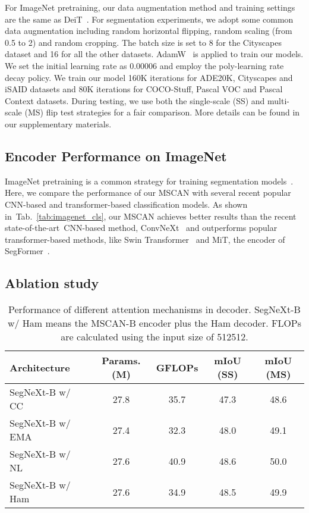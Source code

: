 \documentclass{article}
\def\sArt{state-of-the-art~}
\newcommand{\tabref}[1]{Tab.~\ref{#1}}
\begin{document}
For ImageNet pretraining, our data augmentation method and training settings are the same as DeiT~\cite{touvron2021training}.
For segmentation experiments, we adopt some common data augmentation including random horizontal flipping, random scaling (from 0.5 to 2) and random cropping.
The batch size is set to
8 for the Cityscapes dataset and 16 for all the other datasets.
AdamW~\cite{loshchilov2017decoupled} is applied to train our models.
We set the initial learning rate as 0.00006 and employ the poly-learning rate decay policy.
We train our model 160K iterations for ADE20K, Cityscapes and iSAID datasets and 
80K iterations for COCO-Stuff, Pascal VOC and Pascal Context datasets.
During testing, we use both the 
single-scale (SS) and multi-scale (MS) flip test strategies  for a fair comparison.
More details can be found in our supplementary materials.





\subsection{Encoder Performance on ImageNet}
\label{sec:imagenet}

ImageNet pretraining is a common strategy for training segmentation models~\cite{zhao2017pyramid,chen2017rethinking,xie2021segformer,yuan2021hrformer,chen2017deeplab}.
Here, we compare the performance of our MSCAN with several recent popular CNN-based
and transformer-based classification models.
As shown in~\tabref{tab:imagenet_cls}, our MSCAN achieves better results than the recent \sArt CNN-based method, ConvNeXt~\cite{liu2022convnet} and outperforms popular transformer-based methods, like Swin Transformer~\cite{liu2021swin} and MiT, the encoder of SegFormer~\cite{xie2021segformer}.




\subsection{Ablation study}


\begin{table}[t]
    \centering
    \renewcommand{\arraystretch}{1}
    \renewcommand{\tabcolsep}{3mm}
    \caption{Performance of different attention mechanisms in decoder. 
    SegNeXt-B w/ Ham means the MSCAN-B encoder plus the Ham decoder.
    FLOPs are calculated using the input size of 512512.
    }
    \begin{tabular}{l|cc|cc}
        \toprule
    	Architecture & Params. (M) & GFLOPs & mIoU (SS) & mIoU (MS)  \\ \midrule
    	SegNeXt-B w/ CC~\cite{huang2019ccnet} & 27.8 & 35.7 & 47.3 & 48.6 \\ 
    	SegNeXt-B w/ EMA~\cite{li2019expectation} & 27.4 & 32.3 & 48.0 & 49.1 \\ 
    	SegNeXt-B w/ NL~\cite{wang2018non} & 27.6 & 40.9 & 48.6 & 50.0 \\ 
    	SegNeXt-B w/ Ham~\cite{geng2021attention} & 27.6 & 34.9 & 48.5 & 49.9 \\ 
        \bottomrule
    \end{tabular}
    \label{tab:ablation_decoder}
\end{table}
\end{document}
